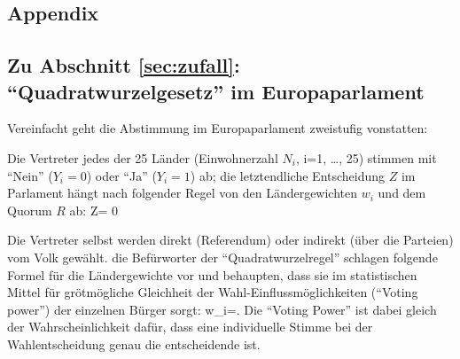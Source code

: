 \begin{appendix}


\chapter{Appendix}


\section{\label{sec:App-quadratwurzel}Zu Abschnitt \protect\ref{sec:zufall}: 
``Quadratwurzelgesetz'' im Europaparlament}


Vereinfacht geht die Abstimmung im Europaparlament zweistufig
vonstatten:
\bi
\item Die Vertreter jedes der 25 L\"ander (Einwohnerzahl $N_i$, i=1,
\ldots,  25) stimmen mit ``Nein'' ($Y_i=0$) oder ``Ja'' ($Y_i=1$) ab; 
die letztendliche Entscheidung $Z$ im Parlament h\"angt nach folgender
Regel von den L\"andergewichten $w_i$ und dem Quorum $R$ ab:
\bdm
Z=
      {0 }{}
\edm

\item Die Vertreter selbst werden direkt (Referendum) oder indirekt
(\"uber die Parteien) vom Volk gew\"ahlt.
\ei
die Bef\"urworter der ``Quadratwurzelregel'' schlagen folgende Formel f\"ur die
L\"andergewichte vor und behaupten, dass sie im
statistischen Mittel f\"ur gr\"o\3tm\"ogliche
Gleichheit der Wahl-Einflussm\"oglichkeiten (``Voting power'') der
einzelnen B\"urger sorgt:
\bdm
w_i=.
\edm
Die ``Voting Power'' ist dabei  gleich der Wahrscheinlichkeit daf\"ur, dass
eine individuelle Stimme bei der Wahlentscheidung genau die entscheidende
ist. 



\end{appendix}
